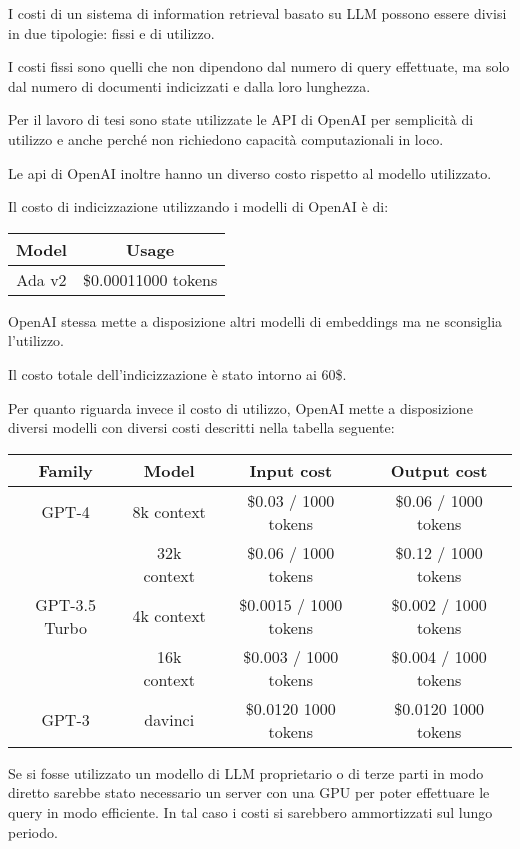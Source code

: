 I costi di un sistema di information retrieval basato su LLM possono essere divisi in due tipologie: fissi e di utilizzo.

I costi fissi sono quelli che non dipendono dal numero di query effettuate, ma solo dal numero di documenti indicizzati e dalla loro lunghezza.

Per il lavoro di tesi sono state utilizzate le API di OpenAI per semplicità di utilizzo e anche perché non richiedono capacità computazionali in loco.

Le api di OpenAI inoltre hanno un diverso costo rispetto al modello utilizzato. 

Il costo di indicizzazione utilizzando i modelli di OpenAI è di:

\begin{center}
    \begin{tabular}{|c|c|}
        \hline
        Model	& Usage \\
        \hline
        Ada v2	& \$0.0001\/1000 tokens \\
        \hline
    \end{tabular}
\end{center}

OpenAI stessa mette a disposizione altri modelli di embeddings ma ne sconsiglia l'utilizzo.

Il costo totale dell'indicizzazione è stato intorno ai 60\$.

Per quanto riguarda invece il costo di utilizzo, OpenAI mette a disposizione diversi modelli con diversi costi descritti nella tabella seguente:

\begin{center}
    \begin{tabular}{|c|c|c|c|}
        \hline
        Family & Model	& Input cost & Output cost \\
        \hline
        GPT-4 & 8k context	& \$0.03 / 1000 tokens &  	\$0.06 / 1000 tokens \\
        \hline
        & 32k context	& \$0.06 / 1000 tokens &  	\$0.12 / 1000 tokens \\
        \hline
        GPT-3.5 Turbo & 4k context	& \$0.0015 / 1000 tokens &  	\$0.002 / 1000 tokens \\
        \hline
        & 16k context	& \$0.003 / 1000 tokens &  	\$0.004 / 1000 tokens \\
        \hline

        GPT-3 & davinci	& \$0.0120 \/ 1000 tokens &  	\$0.0120  \/ 1000 tokens \\
        \hline
    \end{tabular}
\end{center}



Se si fosse utilizzato un modello di LLM proprietario o di terze parti in modo diretto sarebbe stato necessario un server con una GPU per poter effettuare le query in modo efficiente. In tal caso i costi si sarebbero ammortizzati sul lungo periodo.


